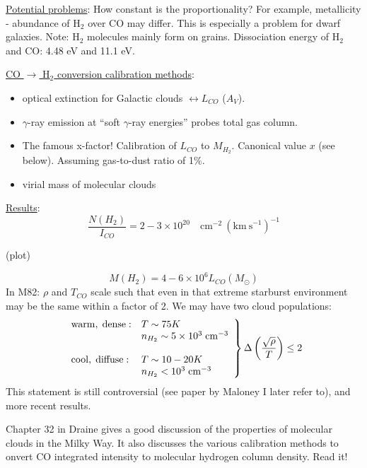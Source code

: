 \documentclass[11pt]{article}
\newcommand{\mar}[1]{\hspace{0pt}\marginpar{-\textcolor{black}{#1}-}}
\begin{document}
\underline{Potential problems}:
How constant is the proportionality? For example, metallicity -
abundance of H$_{2}$ over CO may differ. This is especially a problem
for dwarf galaxies. Note: H$_{2}$ molecules mainly form on grains.
Dissociation energy of H$_{2}$ and CO: 4.48 eV and 11.1 eV.

\underline{CO $\rightarrow$ H$_{2}$ conversion calibration methods}:
\begin{itemize}
    \item optical extinction for Galactic clouds $\leftrightarrow L_{CO}$
        ($A_{V}$).
    \item $\gamma$-ray emission at ``soft $\gamma$-ray energies'' probes
        total gas column.
    \item The famous x-factor! Calibration of $L_{CO}$ to $M_{H_{2}}$.
        Canonical value $x$ (see below).
        Assuming gas-to-dust ratio of 1\%.
    \item virial mass of molecular clouds
\end{itemize}

\underline{Results}:
\[
    \frac{N(H_{2})}{I_{CO}} = 2\!-\!3 \times 10^{20}\quad
    \mathrm{cm}^{-2}\
    (\mathrm{km\ s}^{-1})^{-1}
    \]

\mar{131}(plot)

\mar{132}
\[
    M(H_{2}) = 4-6 \times 10^{6} L_{CO} (M_{\odot})
    \]
In M82: $\rho$ and $T_{CO}$ scale such that even in that extreme starburst
environment may be the same within a factor of 2. We may have two cloud
populations:
\[
    \left.
    \begin{array}{l l}
        \mathrm{warm,\; dense:} & T \sim 75 K \\
                & n_{H_{2}} \sim 5 \times 10^{3}\; \mathrm{cm}^{-3}\\
                &  \\
        \mathrm{cool,\; diffuse:} & T \sim 10-20 K \\
                & n_{H_{2}} < 10^{3}\; \mathrm{cm}^{-3}\\
    \end{array}
    \right\} \Delta \left( \frac{\sqrt{\rho}}{T} \right) \leq 2
    \]
This statement is still controversial (see paper by Maloney I later refer
to), and more recent results.

Chapter 32 in Draine gives a good discussion of the properties of molecular
clouds in the Milky Way. It also discusses the various calibration methods
to onvert CO integrated intensity to molecular hydrogen column density.
Read it!
\end{document}
